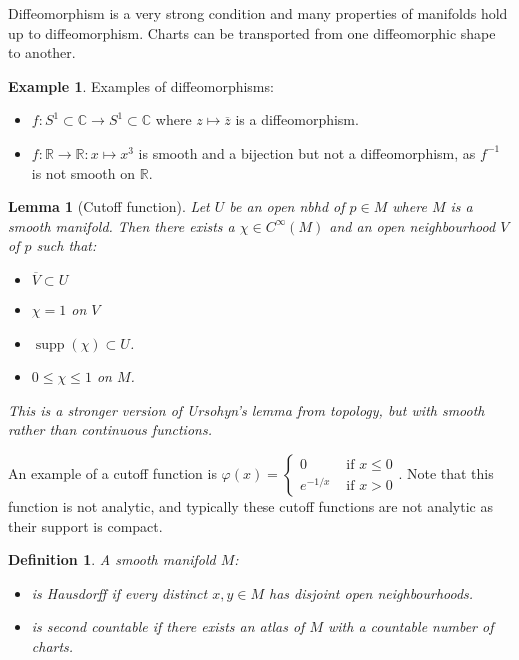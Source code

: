 \documentclass{article}
\newtheorem{lemma}[theorem]{Lemma}
\newtheorem{definition}[theorem]{Definition}
\theoremstyle{definition}
\newtheorem{example}[theorem]{Example}
\numberwithin{theorem}{section}
\numberwithin{equation}{section}
\DeclareMathOperator{\supp}{supp}
\begin{document}
Diffeomorphism is a very strong condition and many properties of manifolds hold up to diffeomorphism. Charts can be transported from one diffeomorphic shape to another. 

\begin{example}
	Examples of diffeomorphisms:
	\begin{itemize}
		\item $f: S^1 \subset \mathbb{C} \rightarrow S^1 \subset \mathbb{C}$ where $z \mapsto \overline{z}$ is a diffeomorphism.
		\item $f: \mathbb{R} \rightarrow \mathbb{R}: x \mapsto x^3$ is smooth and a bijection but not a diffeomorphism, as $f^{-1}$ is not smooth on $\mathbb{R}$. 
	\end{itemize}
\end{example}

\begin{lemma}[Cutoff function]
	Let $U$ be an open nbhd of $p \in M$ where $M$ is a smooth manifold. Then there exists a $\chi \in C^\infty(M)$ and an open neighbourhood $V$ of $p$ such that:
	\begin{itemize}
		\item $\overline{V} \subset U$
		\item $\chi = 1$ on $V$
		\item $\supp (\chi) \subset U$.
		\item $0 \leq \chi \leq 1$ on $M$.
	\end{itemize}
	This is a stronger version of Ursohyn's lemma from topology, but with smooth rather than continuous functions.
\end{lemma}
An example of a cutoff function is $\varphi(x) = \begin{cases}
0 &\text{ if } x \leq 0\\
e^{-1/x} &\text{ if } x > 0	
\end{cases}
$.
Note that this function is not analytic, and typically these cutoff functions are not analytic as their support is compact. 
\begin{definition}
	A smooth manifold $M$:
	\begin{itemize}
		\item is Hausdorff if every distinct $x, y \in M$ has disjoint open neighbourhoods.
		\item is second countable if there exists an atlas of $M$ with a countable number of charts.  
	\end{itemize}
\end{definition}
\end{document}
